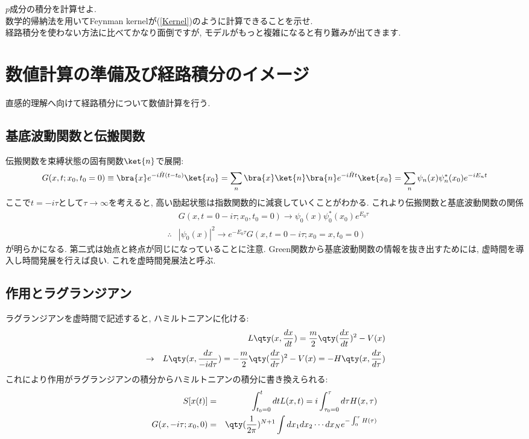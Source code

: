 \documentclass[10.5pt,a4paper]{jreport}
\begin{document}
 $p$成分の積分を計算せよ.\\

 数学的帰納法を用いてFeynman kernelが(\ref{Kernel})のように計算できることを示せ.\\

経路積分を使わない方法に比べてかなり面倒ですが, モデルがもっと複雑になると有り難みが出てきます. 
\section{数値計算の準備及び経路積分のイメージ}
直感的理解へ向けて経路積分について数値計算を行う.
\subsection{基底波動関数と伝搬関数}
伝搬関数を束縛状態の固有関数$\ket{n}$で展開:
\begin{eqnarray}
  G(x, t; x_0, t_0=0) \equiv \bra{x}e^{-i\hat{H}(t-t_0)}\ket{x_0} = \sum_n\bra{x}\ket{n}\bra{n}e^{-i\hat{H}t}\ket{x_0} = \sum_n\psi_n(x)\psi_n^*(x_0)e^{-iE_nt}
\end{eqnarray}
ここで$t = -i\tau$として$\tau\rightarrow\infty$を考えると, 高い励起状態は指数関数的に減衰していくことがわかる. これより伝搬関数と基底波動関数の関係
\begin{eqnarray}
  &&G(x, t= 0 -i\tau; x_0, t_0=0) \rightarrow \psi_0(x)\psi_0^*(x_0)e^{E_0\tau}\\
  &\therefore&|\psi_0(x)|^2 \rightarrow e^{-E_0\tau}G(x, t= 0 -i\tau; x_0=x, t_0=0)\label{GroundGreen}
\end{eqnarray}
が明らかになる. 第二式は始点と終点が同じになっていることに注意. Green関数から基底波動関数の情報を抜き出すためには, 虚時間を導入し時間発展を行えば良い. これを虚時間発展法と呼ぶ.
\subsection{作用とラグランジアン}
ラグランジアンを虚時間で記述すると, ハミルトニアンに化ける:
\begin{eqnarray}
  &&L\qty(x, \frac{dx}{dt}) = \frac{m}{2}\qty(\frac{dx}{dt})^2 - V(x)\\
  &\rightarrow& L\qty(x, \frac{dx}{-id\tau}) = -\frac{m}{2}\qty(\frac{dx}{d\tau})^2 - V(x) = -H\qty(x, \frac{dx}{d\tau})
\end{eqnarray}
これにより作用がラグランジアンの積分からハミルトニアンの積分に書き換えられる:
\begin{eqnarray}
  S[x(t)] &=& \int_{t_0=0}^{t}dtL(x, t) = i\int_{\tau_0=0}^{\tau}d\tau H(x,\tau)\label{prob10_1}\\
  G(x, -i\tau; x_0, 0) &=& \qty(\frac{1}{2\pi})^{N+1}\int dx_1 dx_2\cdots dx_N e^{-\int_0^{\tau} H(\tau)}\label{prob10_2}
\end{eqnarray}\\
\end{document}
